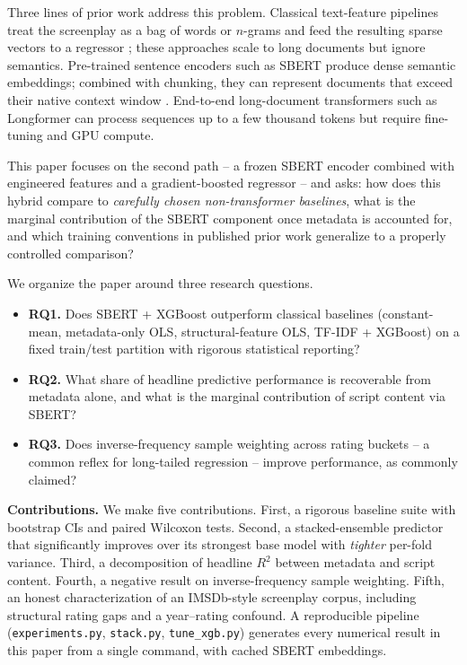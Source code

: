 \documentclass[runningheads]{llncs}
\begin{document}
Three lines of prior work address this problem. Classical
text-feature pipelines treat the screenplay as a bag of words or
$n$-grams and feed the resulting sparse vectors to a regressor
\cite{ref3,ref4,ref26}; these approaches scale to long documents
but ignore semantics. Pre-trained sentence encoders such as SBERT
\cite{ref2} produce dense semantic embeddings; combined with
chunking, they can represent documents that exceed their native
context window \cite{ref19}. End-to-end long-document transformers
such as Longformer \cite{ref1} can process sequences up to a few
thousand tokens but require fine-tuning and GPU compute.

This paper focuses on the second path -- a frozen SBERT encoder
combined with engineered features and a gradient-boosted regressor
-- and asks: how does this hybrid compare to \emph{carefully
chosen non-transformer baselines}, what is the marginal
contribution of the SBERT component once metadata is accounted
for, and which training conventions in published prior work
generalize to a properly controlled comparison?

We organize the paper around three research questions.

\begin{itemize}
\item \textbf{RQ1.} Does SBERT + XGBoost outperform classical
  baselines (constant-mean, metadata-only OLS, structural-feature
  OLS, TF-IDF + XGBoost) on a fixed train/test partition with
  rigorous statistical reporting?
\item \textbf{RQ2.} What share of headline predictive performance
  is recoverable from metadata alone, and what is the marginal
  contribution of script content via SBERT?
\item \textbf{RQ3.} Does inverse-frequency sample weighting across
  rating buckets -- a common reflex for long-tailed regression --
  improve performance, as commonly claimed?
\end{itemize}

\noindent\textbf{Contributions.}
We make five contributions. First, a rigorous baseline suite with
bootstrap CIs and paired Wilcoxon tests. Second, a stacked-ensemble
predictor that significantly improves over its strongest base model
with \emph{tighter} per-fold variance. Third, a decomposition of
headline $R^{2}$ between metadata and script content. Fourth, a
negative result on inverse-frequency sample weighting. Fifth, an
honest characterization of an IMSDb-style screenplay corpus,
including structural rating gaps and a year--rating confound. A
reproducible pipeline (\texttt{experiments.py}, \texttt{stack.py},
\texttt{tune\_xgb.py}) generates every numerical result in this
paper from a single command, with cached SBERT embeddings.
\end{document}
